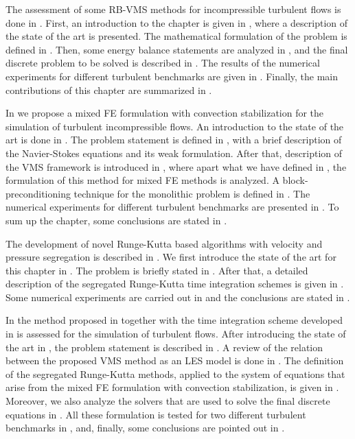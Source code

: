 The assessment of some RB-VMS methods for incompressible turbulent flows is done in . First, an introduction to the chapter is given in , where a description of the state of the art is presented. The mathematical formulation of the problem is defined in . Then, some energy balance statements are analyzed in , and the final discrete problem to be solved is described in . The results of the numerical experiments for different turbulent benchmarks are given in . Finally, the main contributions of this chapter are summarized in .

In  we propose a mixed FE formulation with convection stabilization for the simulation of turbulent incompressible flows. An introduction to the state of the art is done in . The problem statement is defined in , with a brief description of the Navier-Stokes equations and its weak formulation. After that, description of the VMS framework is introduced in , where apart what we have defined in , the formulation of this method for mixed FE methods is analyzed. A block-preconditioning technique for the monolithic problem is defined in . The numerical experiments for different turbulent benchmarks are presented in . To sum up the chapter, some conclusions are stated in .

The development of novel Runge-Kutta based algorithms with velocity and pressure segregation is described in . We first introduce the state of the art for this chapter in . The problem is briefly stated in . After that, a detailed description of the segregated Runge-Kutta time integration schemes is given in . Some numerical experiments are carried out in  and the conclusions are stated in .

In  the method proposed in  together with the time integration scheme developed in  is assessed for the simulation of turbulent flows. After introducing the state of the art in , the problem statement is described in . A review of the relation between the proposed VMS method as an LES model is done in . The definition of the segregated Runge-Kutta methods, applied to the system of equations that arise from the mixed FE formulation with convection stabilization, is given in . Moreover, we also analyze the solvers that are used to solve the final discrete equations in . All these formulation is tested for two different turbulent benchmarks in , and, finally, some conclusions are pointed out in .


